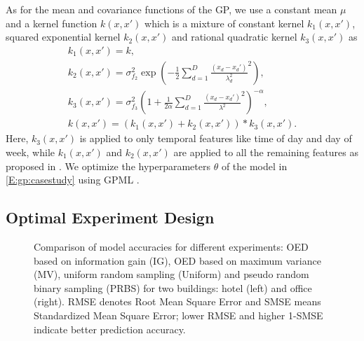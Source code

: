 As for the mean and covariance functions of the GP, %
we use a constant mean \(\mu\) and a kernel function \(k(x,x')\) which is a mixture of constant kernel \(k_1(x,x')\), squared exponential kernel \(k_2(x,x')\) and rational quadratic kernel \(k_3(x,x')\) as
\begin{gather}
k_1(x,x')  = k, \nonumber\\
k_2(x,x') = \sigma_{f_2}^2 \exp \left( -\frac{1}{2} \sum_{d=1}^D \frac{(x_d-x_d')}{{\lambda_d^2}}^2 \right),
 \nonumber\\
 k_3(x,x') = \sigma_{f_3}^2  \left( 1+ \frac{1}{2\alpha} \sum_{d=1}^D \frac{(x_d-x_d')}{{\lambda^2}}^2 \right)^{-\alpha},  \nonumber\\
k(x,x') = \left(k_1(x,x') + k_2(x,x')\right)*k_3(x,x').
\end{gather}
Here, \(k_3(x,x')\) is applied to only temporal features like time of day and day of week, while \(k_1(x,x')\) and \(k_2(x,x')\) are applied to all the remaining features as proposed in \cite{nghiemetal16gp}.
We optimize the hyperparameters \(\theta\) %
of the model in \eqref{E:gp:casestudy} using GPML \cite{Rasmussen2010}.

\subsection{Optimal Experiment Design}

\begin{figure*}[t]
	\centering
	\setlength{}
	\setlength{}
	
	
	\caption{Comparison of model accuracies for different experiments: OED based on information gain (IG),  OED based on maximum variance (MV), uniform random sampling (Uniform) and pseudo random binary sampling (PRBS) for two buildings: hotel (left) and office (right). RMSE denotes Root Mean Square Error and SMSE means Standardized Mean Square Error; lower RMSE and higher 1-SMSE indicate better prediction accuracy.}
	\captionsetup{justification=centering}
	\label{F:casestudy:oed}
\end{figure*}

